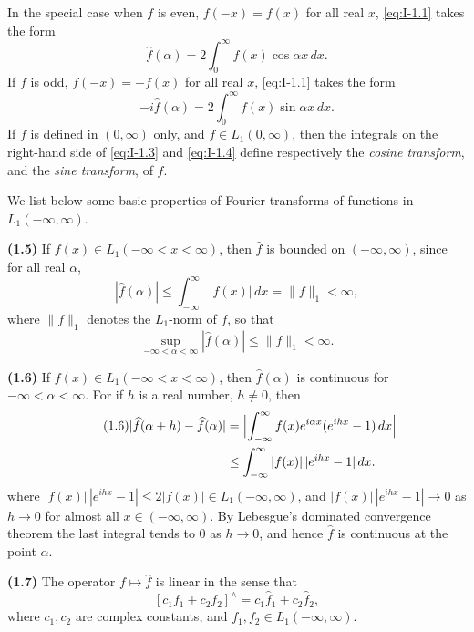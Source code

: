 In the special case when $f$ is even, $f(-x)=f(x)$ for all real $x$, \eqref{eq:I-1.1} takes the form
\begin{equation}\label{eq:I-1.3}
\hat f(\alpha)=2\int_0^\infty f(x)\cos\alpha x\,dx.
\end{equation}
If $f$ is odd, $f(-x)=-f(x)$ for all real $x$, \eqref{eq:I-1.1} takes the form
\begin{equation}\label{eq:I-1.4}
-i\hat f(\alpha)=2\int_0^\infty f(x)\sin\alpha x\,dx.
\end{equation}
If $f$ is defined in $(0,\infty)$ only, and $f\in L_1(0,\infty)$, then the integrals on the right-hand side of \eqref{eq:I-1.3} and \eqref{eq:I-1.4} define respectively the \emph{cosine transform}, and the \emph{sine transform}, of $f$.

We list below some basic properties of Fourier transforms of functions in $L_1(-\infty,\infty)$.

\noindent\textbf{(1.5)} If $f(x)\in L_1(-\infty<x<\infty)$, then $\hat f$ is bounded on $(-\infty,\infty)$, since for all real $\alpha$,
\begin{equation}\label{eq:I-1.5}
|\widehat f(\alpha)|\le\int_{-\infty}^{\infty}|f(x)|\,dx=\|f\|_1<\infty,
\end{equation}
where $\|f\|_1$ denotes the $L_1$-norm of $f$, so that
\begin{equation}\label{eq:I-1.5b}
\sup_{-\infty<\alpha<\infty}|\widehat f(\alpha)|\le\|f\|_1<\infty.
\end{equation}

\noindent\textbf{(1.6)} If $f(x)\in L_1(-\infty<x<\infty)$, then $\hat f(\alpha)$ is continuous for $-\infty<\alpha<\infty$. For if $h$ is a real number, $h\neq 0$, then
\begin{align}\tag{1.6}\label{eq:I-1.6}
|\widehat f(\alpha+h)-\widehat f(\alpha)|
&=\Bigl|\int_{-\infty}^{\infty}f(x)e^{i\alpha x}(e^{ihx}-1)\,dx\Bigr|\\
&\le\int_{-\infty}^{\infty}|f(x)|\,|e^{ihx}-1|\,dx.
\end{align}
where $|f(x)|\,|e^{ihx}-1|\le 2|f(x)|\in L_1(-\infty,\infty)$, and $|f(x)|\,|e^{ihx}-1|\to 0$ as $h\to 0$ for almost all $x\in(-\infty,\infty)$. By Lebesgue's dominated convergence theorem the last integral tends to $0$ as $h\to 0$, and hence $\hat f$ is continuous at the point $\alpha$.

\noindent\textbf{(1.7)} The operator $f\mapsto\hat f$ is linear in the sense that
\begin{equation}\label{eq:I-1.7}
[c_1f_1+c_2f_2]^{\wedge}=c_1\hat f_1+c_2\hat f_2,
\end{equation}
where $c_1,c_2$ are complex constants, and $f_1,f_2\in L_1(-\infty,\infty)$.

